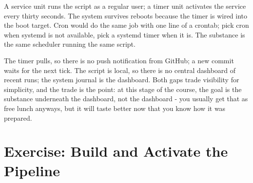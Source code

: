 
A service unit runs the script as a regular user; a timer unit
activates the service every thirty seconds.
The system survives reboots because the timer is wired into the
boot target.
Cron would do the same job with one line of a crontab; pick cron
when systemd is not available, pick a systemd timer when it is.
The substance is the same scheduler running the same script.


The timer pulls, so there is no push notification from GitHub; a
new commit waits for the next tick.
The script is local, so there is no central dashboard of recent
runs; the system journal is the dashboard.
Both gaps trade visibility for simplicity, and the trade is the
point: at this stage of the course, the goal is the substance
underneath the dashboard, not the dashboard - you usually get that as free lunch anyways, 
but it will taste better now that you know how it was prepared. 


\newpage
\section{Exercise: Build and Activate the Pipeline}

